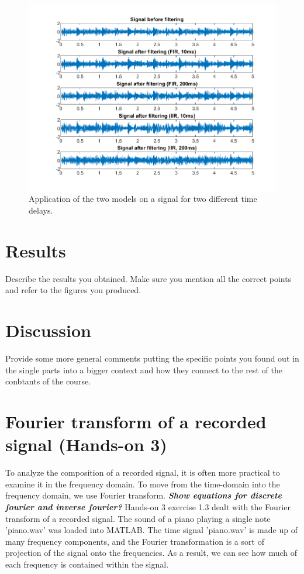 \documentclass[journal]{IEEEtran}
\begin{document}
\begin{figure}
    \centering
    \includegraphics[width=\linewidth]{assignment_01/plots/bounce_signals.png}
    \caption{Application of the two models on a signal for two different time delays.}
    \label{fig:bounce:signals}
\end{figure}

\clearpage
\newpage

\section{Results}
Describe the results you obtained. Make sure you mention all the correct points and refer to the figures you produced.

\section{Discussion}
Provide some more general comments putting the specific points you found out in the single parts into a bigger context and how they connect to the rest of the conbtants of the course.



\clearpage
\section{Fourier transform of a recorded signal (Hands-on 3)}
To analyze the composition of a recorded signal, it is often more practical to examine it in the frequency domain. To move from the time-domain into the frequency domain, we use Fourier transform. 
\newline
\textit{\textbf{Show equations for discrete fourier and inverse fourier?}}
\newline
Hands-on 3 exercise 1.3 dealt with the Fourier transform of a recorded signal. The sound of a piano playing a single note 'piano.wav' was loaded into MATLAB. The time signal 'piano.wav' is made up of many frequency components, and the Fourier transformation is a sort of projection of the signal onto the frequencies. As a result, we can see how much of each frequency is contained within the signal. 
\end{document}
